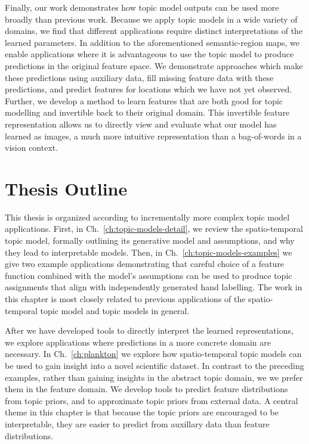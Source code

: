 Finally, our work demonstrates how topic model outputs can be used more broadly than previous work. Because we apply topic models in a wide variety of domains, we find that different applications require distinct interpretations of the learned parameters. In addition to the aforementioned semantic-region maps, we enable applications where it is advantageous to use the topic model to produce predictions in the original feature space. We demonstrate approaches which make these predictions using auxiliary data, fill missing feature data with these predictions, and predict features for locations which we have not yet observed. Further, we develop a method to learn features that are both good for topic modelling and invertible back to their original domain. This invertible feature representation allows us to directly view and evaluate what our model has learned as images, a much more intuitive representation than a bag-of-words in a vision context.

\section{Thesis Outline}

This thesis is organized according to incrementally more complex topic model applications. First, in Ch.~\ref{ch:topic-models-detail}, we review the spatio-temporal topic model, formally outlining its generative model and assumptions, and why they lead to interpretable models. Then, in Ch.~\ref{ch:topic-models-examples} we give two example applications demonstrating that careful choice of a feature function combined with the model's assumptions can be used to produce topic assignments that align with independently generated hand labelling. The work in this chapter is most closely related to previous applications of the spatio-temporal topic model and topic models in general.

After we have developed tools to directly interpret the learned representations, we explore applications where predictions in a more concrete domain are necessary. In Ch.~\ref{ch:plankton} we explore how spatio-temporal topic models can be used to gain insight into a novel scientific dataset. In contrast to the preceding examples, rather than gaining insights in the abstract topic domain, we we prefer them in the feature domain. We develop tools to predict feature distributions from topic priors, and to approximate topic priors from external data. A central theme in this chapter is that because the topic priors are encouraged to be interpretable, they are easier to predict from auxillary data than feature distributions.

